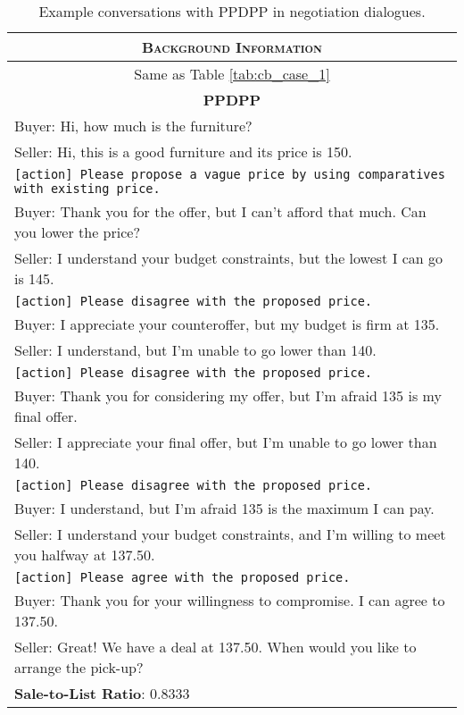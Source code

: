 \begin{table}[]
    \centering
    \begin{tabular}{p{13.5cm}}
    \toprule
    \multicolumn{1}{c}{\textsc{\textbf{Background Information}}}\\
    \midrule
    \multicolumn{1}{c}{Same as Table \ref{tab:cb_case_1}}\\
    \midrule
    \midrule
    \multicolumn{1}{c}{\textsc{\textbf{PPDPP}}}\\
    \midrule
    Buyer: Hi, how much is the furniture?\\
Seller: Hi, this is a good furniture and its price is 150.\\
\texttt{[action] Please propose a vague price by using comparatives with existing price.}\\
Buyer: Thank you for the offer, but I can't afford that much. Can you lower the price?\\
Seller: I understand your budget constraints, but the lowest I can go is 145.\\
\texttt{[action] Please disagree with the proposed price.}\\
Buyer: I appreciate your counteroffer, but my budget is firm at 135.\\
Seller: I understand, but I'm unable to go lower than 140.\\
\texttt{[action] Please disagree with the proposed price.}\\
Buyer: Thank you for considering my offer, but I'm afraid 135 is my final offer.\\
Seller: I appreciate your final offer, but I'm unable to go lower than 140.\\
\texttt{[action] Please disagree with the proposed price.}\\
Buyer: I understand, but I'm afraid 135 is the maximum I can pay.\\
Seller: I understand your budget constraints, and I'm willing to meet you halfway at 137.50.\\
\texttt{[action] Please agree with the proposed price.}\\
Buyer: Thank you for your willingness to compromise. I can agree to 137.50.\\
Seller: Great! We have a deal at 137.50. When would you like to arrange the pick-up?\\
    \midrule
    \textbf{Sale-to-List Ratio}: 0.8333 \\
    \bottomrule
    \end{tabular}
    \caption{Example conversations with PPDPP in negotiation dialogues. }
    \label{tab:cb_case_3}
\end{table}